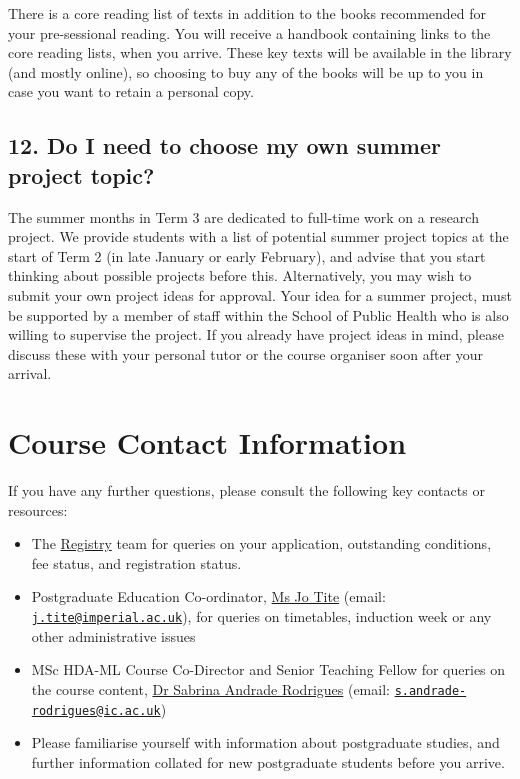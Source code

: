 \documentclass[
]{book}
\providecommand{\tightlist}{%
  \setlength{\itemsep}{0pt}\setlength{\parskip}{0pt}}
\begin{document}
There is a core reading list of texts in addition to the books recommended for your pre-sessional reading. You will receive a handbook containing links to the core reading lists, when you arrive. These key texts will be available in the library (and mostly online), so choosing to buy any of the books will be up to you in case you want to retain a personal copy.

\section*{12. Do I need to choose my own summer project topic?}\label{do-i-need-to-choose-my-own-summer-project-topic}

The summer months in Term 3 are dedicated to full-time work on a research project. We provide students with a list of potential summer project topics at the start of Term 2 (in late January or early February), and advise that you start thinking about possible projects before this. Alternatively, you may wish to submit your own project ideas for approval. Your idea for a summer project, must be supported by a member of staff within the School of Public Health who is also willing to supervise the project. If you already have project ideas in mind, please discuss these with your personal tutor or the course organiser soon after your arrival.

\chapter{Course Contact Information}\label{contact-info}

If you have any further questions, please consult the following key contacts or resources:

\begin{itemize}
\tightlist
\item
  The \href{https://www.imperial.ac.uk/admin-services/registry/}{Registry} team for queries on your application, outstanding conditions, fee status, and registration status.
\item
  Postgraduate Education Co-ordinator, \href{https://www.imperial.ac.uk/people/j.tite}{Ms Jo Tite} (email: \href{mailto:j.tite@imperial.ac.uk}{\nolinkurl{j.tite@imperial.ac.uk}}), for queries on timetables, induction week or any other administrative issues
\item
  MSc HDA-ML Course Co-Director and Senior Teaching Fellow for queries on the course content, \href{https://profiles.imperial.ac.uk/s.andrade-rodrigues}{Dr Sabrina Andrade Rodrigues} (email: \href{mailto:s.andrade-rodrigues@ic.ac.uk}{\nolinkurl{s.andrade-rodrigues@ic.ac.uk}})
\item
  Please familiarise yourself with information about postgraduate studies, and further information collated for new postgraduate students before you arrive.
\end{itemize}
\end{document}
